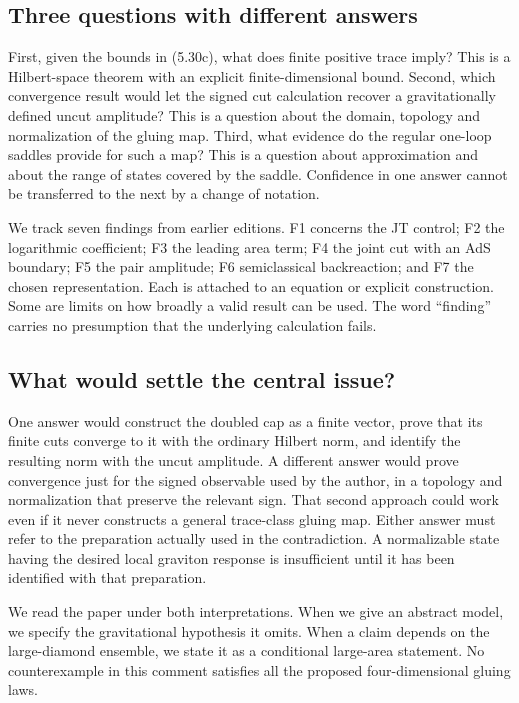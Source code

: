 \documentclass[11pt]{article}
\begin{document}
\subsection{Three questions with different answers}
First, given the bounds in (5.30c), what does finite positive trace imply? This is a Hilbert-space theorem with an explicit finite-dimensional bound. Second, which convergence result would let the signed cut calculation recover a gravitationally defined uncut amplitude? This is a question about the domain, topology and normalization of the gluing map. Third, what evidence do the regular one-loop saddles provide for such a map? This is a question about approximation and about the range of states covered by the saddle. Confidence in one answer cannot be transferred to the next by a change of notation.

We track seven findings from earlier editions. F1 concerns the JT control; F2 the logarithmic coefficient; F3 the leading area term; F4 the joint cut with an AdS boundary; F5 the pair amplitude; F6 semiclassical backreaction; and F7 the chosen representation. Each is attached to an equation or explicit construction. Some are limits on how broadly a valid result can be used. The word ``finding'' carries no presumption that the underlying calculation fails.

\subsection{What would settle the central issue?}
One answer would construct the doubled cap as a finite vector, prove that its finite cuts converge to it with the ordinary Hilbert norm, and identify the resulting norm with the uncut amplitude. A different answer would prove convergence just for the signed observable used by the author, in a topology and normalization that preserve the relevant sign. That second approach could work even if it never constructs a general trace-class gluing map. Either answer must refer to the preparation actually used in the contradiction. A normalizable state having the desired local graviton response is insufficient until it has been identified with that preparation.

We read the paper under both interpretations. When we give an abstract model, we specify the gravitational hypothesis it omits. When a claim depends on the large-diamond ensemble, we state it as a conditional large-area statement. No counterexample in this comment satisfies all the proposed four-dimensional gluing laws.
\end{document}
